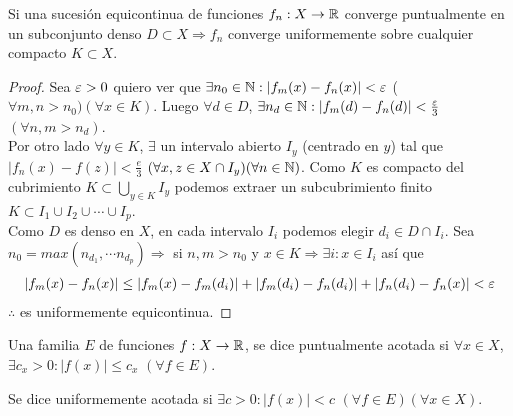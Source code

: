 \begin{theorem}
  Si una sucesión equicontinua de funciones $f_n: X \to \mathbb{R}$ converge puntualmente en un subconjunto denso $D \subset X \Rightarrow f_n$ converge uniformemente sobre cualquier compacto $K \subset X$.

  \begin{proof}
    Sea $\varepsilon > 0$ quiero ver que $\exists n_0 \in \mathbb{N} : |f_m(x) - f_n(x)| < \varepsilon$ ($\forall m, n > n_0)(\forall x \in K)$. Luego $\forall d \in D$, $\exists n_d \in \mathbb{N} : |f_m(d) - f_n(d)| < \frac{\varepsilon}{3}$ $(\forall n, m > n_d)$. \\
    Por otro lado $\forall y \in K$, $\exists$ un intervalo abierto $I_y$ (centrado en $y$) tal que $|f_n(x) - f(z)| < \frac{e}{3}$ $(\forall x, z \in X \cap I_y)(\forall n \in \mathbb{N})$. Como $K$ es compacto del cubrimiento $K \subset \bigcup_{y \in K} I_y$ podemos extraer un subcubrimiento finito $K \subset I_1 \cup I_2 \cup \cdots \cup I_p$. \\
    Como $D$ es denso en $X$, en cada intervalo $I_i$ podemos elegir $d_i \in D \cap I_i$. Sea $n_0 = max(n_{d_1}, \cdots n_{d_p}) \Rightarrow$ si $n, m > n_0$ y $x \in K \Rightarrow \exists i : x \in I_i$ así que \begin{align*}
      |f_m(x) - f_n(x)| \leq |f_m(x) - f_m(d_i)| + |f_m(d_i) - f_n(d_i)| + |f_n(d_i) - f_n(x)| < \varepsilon
    \end{align*} $\therefore$ es uniformemente equicontinua.
  \end{proof}
\end{theorem}

\begin{definition}
  Una familia $E$ de funciones $f: X \to \mathbb{R}$, se dice puntualmente acotada si $\forall x \in X$, $\exists c_x > 0 : |f(x)| \leq c_x$ $(\forall f \in E)$.
\end{definition}

\begin{definition}
  Se dice uniformemente acotada si $\exists c > 0 : |f(x)| < c$ $(\forall f \in E)(\forall x \in X)$.
\end{definition}

\clearpage

